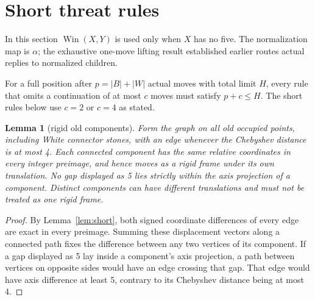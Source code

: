 \documentclass[11pt]{article}
\newtheorem{lemma}[theorem]{Lemma}
\theoremstyle{definition}
\theoremstyle{remark}
\newcommand{\A}{\alpha}
\newcommand{\Win}{\operatorname{Win}}
\begin{document}
\section{Short threat rules}\label{sec:short}
In this section $\Win(X,Y)$ is used only when $X$ has no five. The normalization map is $\A$; the exhaustive one-move lifting result established earlier routes actual replies to normalized children.

For a full position after $p=|B|+|W|$ actual moves with total limit $H$, every rule that omits a continuation of at most $c$ moves must satisfy $p+c\le H$. The short rules below use $c=2$ or $c=4$ as stated.

\begin{lemma}[rigid old components]\label{mac:rigid-frame}
Form the graph on all old occupied points, including White connector stones, with an edge whenever the Chebyshev distance is at most 4. Each connected component has the same relative coordinates in every integer preimage, and hence moves as a rigid frame under its own translation. No gap displayed as 5 lies strictly within the axis projection of a component. Distinct components can have different translations and must not be treated as one rigid frame.
\end{lemma}
\begin{proof}
By Lemma~\ref{lem:short}, both signed coordinate differences of every edge are exact in every preimage. Summing these displacement vectors along a connected path fixes the difference between any two vertices of its component. If a gap displayed as 5 lay inside a component's axis projection, a path between vertices on opposite sides would have an edge crossing that gap. That edge would have axis difference at least 5, contrary to its Chebyshev distance being at most 4.
\end{proof}
\end{document}
